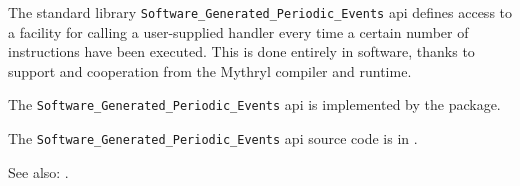 
The standard library {\tt Software\_Generated\_Periodic\_Events} api defines access to a facility for 
calling a user-supplied handler every time a certain number of instructions have been executed.  This 
is done entirely in software, thanks to support and cooperation from the Mythryl compiler and runtime. 

The {\tt Software\_Generated\_Periodic\_Events} api is implemented by the  package.

The {\tt Software\_Generated\_Periodic\_Events} api source code is in .

See also:  .